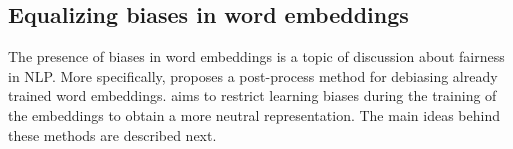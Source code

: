 \documentclass[11pt,a4paper]{article}
\begin{document}





\subsection{Equalizing biases in word embeddings}

The presence of biases in word embeddings is a topic of discussion about fairness in NLP.
More specifically, \citet{bolukbasi2016} proposes a post-process method for debiasing already trained word embeddings. 
\cite{DBLP:conf/emnlp/ZhaoZLWC18} aims to restrict learning biases during the training of the embeddings to obtain a more neutral representation.
The main ideas behind these methods are described next.




\end{document}
